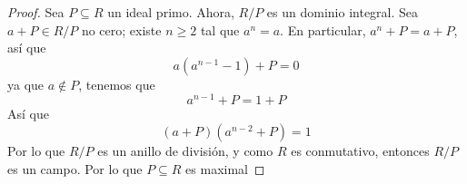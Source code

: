 \begin{problem}[25]
\end{problem}

\begin{proof}
    Sea $P \subseteq R$ un ideal primo. Ahora, $R/P$ es un dominio integral. Sea $ a + P \in R/P $ no cero; existe $n \geq 2$ tal que $a^n = a$. En particular, $a^n + P = a + P$, así que 
    $$ a(a^{n-1}-1)+P = 0 $$
    ya que $a \notin P$, tenemos que 
    $$ a^{n-1} + P = 1 + P $$
    Así que 
    $$ (a+P)(a^{n-2}+P) = 1 $$
    Por lo que $R/P$ es un anillo de división, y como $R$ es conmutativo, entonces $R/P$ es un campo. Por lo que $ P \subseteq R$ es maximal
\end{proof}